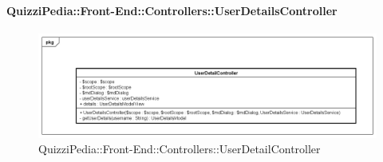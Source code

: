 \paragraph{QuizziPedia::Front-End::Controllers::UserDetailsController}
\begin{figure} [ht]
	\centering
	\includegraphics[scale=0.45]{UML/Classi/Front-End/QuizziPedia_Front-end_Controller_UserDetailController.png}
	\caption{QuizziPedia::Front-End::Controllers::UserDetailController}
\end{figure} \FloatBarrier
